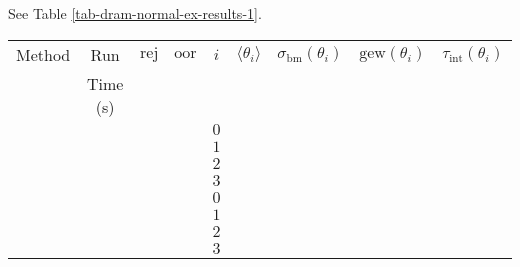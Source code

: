 See Table \ref{tab-dram-normal-ex-results-1}.

\begin{table}[h!]
\begin{center}
\begin{tabular}{|c|c|c|c|c|c|c|c|c|}
\hline
Method & Run      & $\text{rej}$           & $\text{oor}$           & $i$ & $\langle\theta_i\rangle$ & $\sigma_{\text{bm}}(\theta_i)$ & $\text{gew}(\theta_i)$ & $\tau_{\text{int}}(\theta_i)$ \\
       & Time (s) &                        &                        &     &                          &                                &                        &                               \\
\hline
\hline
       &          &                        &                        & $0$ &                          &                                &                        &                               \\
\cline{5-9}
       &          &                        &                        & $1$ &                          &                                &                        &                               \\
\cline{5-9}
       &          &                        &                        & $2$ &                          &                                &                        &                               \\
\cline{5-9}
       &          &                        &                        & $3$ &                          &                                &                        &                               \\
\hline
\hline
       &          &                        &                        & $0$ &                          &                                &                        &                               \\
\cline{5-9}
       &          &                        &                        & $1$ &                          &                                &                        &                               \\
\cline{5-9}
       &          &                        &                        & $2$ &                          &                                &                        &                               \\
\cline{5-9}
       &          &                        &                        & $3$ &                          &                                &                        &                               \\

\end{tabular}
\end{center}
\end{table}
